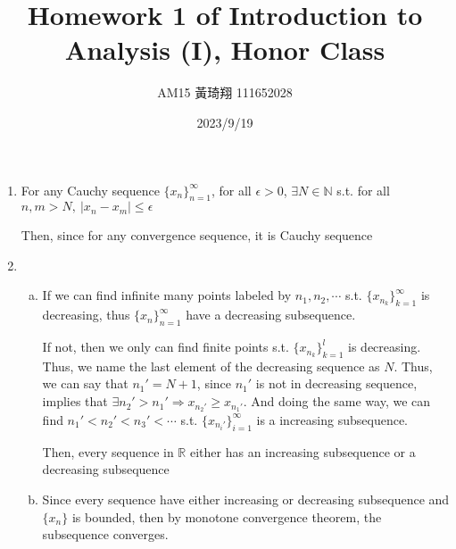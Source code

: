 \documentclass[12pt]{article}
\title{Homework 1 of Introduction to Analysis (I), Honor Class}
\author{AM15 黃琦翔 111652028}
\date{2023/9/19}
\begin{document}
\maketitle
\begin{enumerate}
    \item For any Cauchy sequence $\lbrace x_n\rbrace_{n=1}^\infty$, for all $\epsilon > 0$, $\exists N \in \mathbb{N}$ s.t. for all $n, m > N,\ |x_n - x_m| \leq \epsilon$

    Then, since for any convergence sequence, it is Cauchy sequence

    \item \begin{enumerate}[(a)]
        \item If we can find infinite many points labeled by $n_1, n_2, \cdots$ s.t. $\lbrace x_{n_k}\rbrace_{k=1}^\infty$ is decreasing, thus $\lbrace x_n\rbrace_{n=1}^\infty$ have a decreasing subsequence.
        
        If not, then we only can find finite points s.t. $\lbrace x_{n_k}\rbrace_{k=1}^l$ is decreasing. Thus, we name the last element of the decreasing sequence as $N$.
        Thus, we can say that $n_1' = N + 1$, since $n_1'$ is not in decreasing sequence, implies that $\exists n_2' > n_1' \Rightarrow x_{n_2'} \geq x_{n_1'}$.
        And doing the same way,  we can find $n_1' < n_2' < n_3' < \cdots$ s.t. $\lbrace x_{n_i'}\rbrace_{i=1}^\infty$ is a increasing subsequence.

        Then, every sequence in $\mathbb{R}$ either has an increasing subsequence or a decreasing subsequence

        \item Since every sequence have either increasing or decreasing subsequence and $\lbrace x_n \rbrace$ is bounded,
        then by monotone convergence theorem, the subsequence converges.

    \end{enumerate} 
\end{enumerate}
\end{document}
